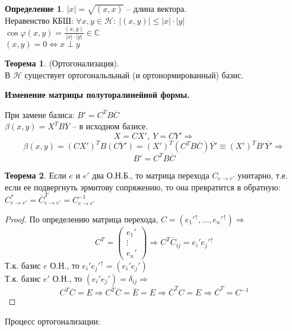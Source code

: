 \documentclass[a4paper, 12pt]{article}
\theoremstyle{definition}
\newtheorem*{definition}{Определение}
\newtheorem*{theorem}{Теорема}
\begin{document}
    \begin{definition}
        $|x| = \sqrt{(x,x)}$ -- длина вектора. \\Неравенство 
        КБШ: $\forall x,y \in \mathcal{H}:\ |(x,y)| \leq |x|
        \cdot |y|$\\
        $\cos \varphi(x,y) = \frac{(x,y)}{|x|\cdot |y|} \in 
        \mathbb{C}$\\
        $(x,y) = 0 \Longleftrightarrow x \perp y$
    \end{definition}
    \begin{theorem}
        (Ортогонализация).\\ В $\mathcal{H}$ существует 
        ортогональльный (и ортонормированный) базис.
    \end{theorem}
    \begin{center}
        \textbf{Изменение матрицы полуторалинейной формы.}
    \end{center}
    При замене базиса: $B' = C^TB\overline{C}$\\
    $\beta(x,y) = X^TB\overline{Y}$ -- в исходном базисе.
    $$X = CX',\ Y = CY' \Longrightarrow$$ $$\beta(x,y) = 
    (CX')^TB\overline{(CY')} = (X')^T(C^TB\overline{C})
    \overline{Y'} \equiv (X')^TB'\overline{Y'} \Longrightarrow $$ $$B' = C^TB\overline{C}$$
    \begin{theorem}
        Если $e$ и $e'$ два О.Н.Б., то матрица перехода 
        $C_{e \to e'}$ унитарно, т.е. если ее подвергнуть 
        эрмитову сопряжению, то она превратится в обратную: $C_{e \to e'}^* = \overline{C}_{e 
        \to e'}^T = C_{e \to e'}^{-1}$    
    \end{theorem}
    \begin{proof}
        По определению матрица перехода, $C = (e_1'^\uparrow
        ,...,e_n'^\uparrow) \Longrightarrow$
        $$C^T = \begin{pmatrix}
            e_1'\\\vdots\\ e_n'
        \end{pmatrix} \Longrightarrow C^T\overline{C}_{ij} =
        e_i'e_j'^\uparrow$$
        Т.к. базис $e$  О.Н., то
        $e_i'e_j'^\uparrow = (e_i'e_j')$\\
        Т.к. базис $e'$ О.Н., то $(e_i'e_j') = \delta_{ij} 
        \Longrightarrow $
        $$C^T\overline{C} = E \Longrightarrow \overline{C^T
        \overline{C}} = \overline{E} = E \Longrightarrow 
        \overline{C}^TC = E \Longrightarrow  \overline{C}^T = 
        C^{-1}$$  
    \end{proof}
    Процесс ортогонализации:
\end{document}
